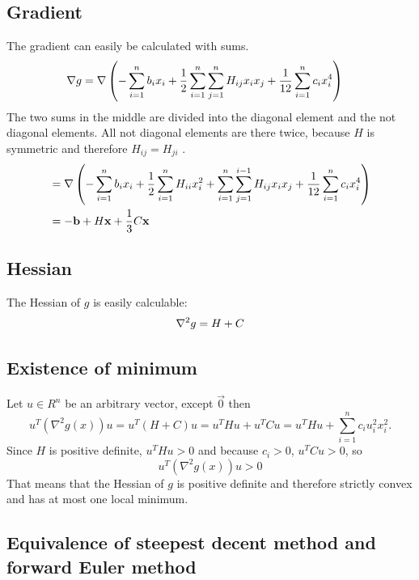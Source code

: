 \documentclass[a4paper,12pt]{article}
\begin{document}
\subsection{Gradient}
The gradient can easily be calculated with sums.
\begin{align*}
{\bf\nabla} g 
&= {\bf \nabla}\left(-\sum_{i=1}^nb_ix_i +\frac12\sum_{i=1}^n\sum_{j=1}^n H_{ij}x_ix_j + \frac1{12}\sum_{i=1}^n c_i x_i^4\right)
\end{align*}
The two sums in the middle are divided into the diagonal element and the not diagonal elements.
All not diagonal elements are there twice, because $H$ is symmetric and therefore $H_{ij} = H_{ji}$ .
\begin{align*}
&= {\bf \nabla}\left(-\sum_{i=1}^nb_ix_i +\frac12\sum_{i=1}^n H_{ii}x_i^2 + \sum_{i=1}^n\sum_{j=1}^{i-1} H_{ij}x_ix_j + \frac1{12}\sum_{i=1}^n c_i x_i^4\right)
\\&= -{\bf b} + H{\bf x} + \frac13C{\bf x}
\end{align*}

\subsection{Hessian}
The Hessian of $g$ is easily calculable:
\begin{align*}
{\bf\nabla}^2 g =  H + C
\end{align*}

\subsection{Existence of minimum}
Let $u\in R^n$ be an arbitrary vector, except $\vec{0}$ then
$$u^T(\nabla^2g(x))u = u^T (H+C) u = u^T H u + u^TCu = u^THu + \sum_{i=1}^n c_iu_i^2x_i^2.$$
Since $H$ is positive definite, $u^THu>0$ and because $c_i>0$, $u^TCu>0$, so 
$$u^T(\nabla^2g(x))u>0$$ 
That means that the Hessian of $g$ is positive definite and therefore strictly convex and has at most one local minimum.

\subsection{Equivalence of steepest decent method and forward Euler method}
\end{document}
